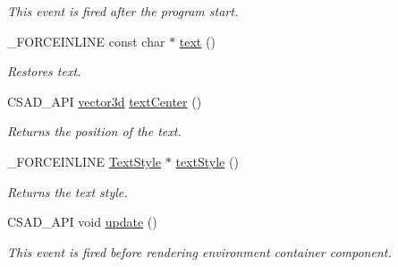 \begin{DoxyCompactItemize}
\begin{DoxyCompactList}\small\item\em This event is fired after the program start. \end{DoxyCompactList}\item 
\hypertarget{classcsad_1_1_text3_d_a189ccec8b8310503a73c5ce304e0e557}{\-\_\-\-F\-O\-R\-C\-E\-I\-N\-L\-I\-N\-E const char $\ast$ \hyperlink{classcsad_1_1_text3_d_a189ccec8b8310503a73c5ce304e0e557}{text} ()}\label{classcsad_1_1_text3_d_a189ccec8b8310503a73c5ce304e0e557}

\begin{DoxyCompactList}\small\item\em Restores text. \end{DoxyCompactList}\item 
\hypertarget{classcsad_1_1_text3_d_ae5732773b756bd15ac48ea9d68140f31}{C\-S\-A\-D\-\_\-\-A\-P\-I \hyperlink{classbt_1_1vector3d}{vector3d} \hyperlink{classcsad_1_1_text3_d_ae5732773b756bd15ac48ea9d68140f31}{text\-Center} ()}\label{classcsad_1_1_text3_d_ae5732773b756bd15ac48ea9d68140f31}

\begin{DoxyCompactList}\small\item\em Returns the position of the text. \end{DoxyCompactList}\item 
\hypertarget{classcsad_1_1_text3_d_a428eb4115f5db77815e829a46e83c505}{\-\_\-\-F\-O\-R\-C\-E\-I\-N\-L\-I\-N\-E \hyperlink{classcsad_1_1_text_style}{Text\-Style} $\ast$ \hyperlink{classcsad_1_1_text3_d_a428eb4115f5db77815e829a46e83c505}{text\-Style} ()}\label{classcsad_1_1_text3_d_a428eb4115f5db77815e829a46e83c505}

\begin{DoxyCompactList}\small\item\em Returns the text style. \end{DoxyCompactList}\item 
\hypertarget{classcsad_1_1_text3_d_ac10717fb94ba35cb7a2d02ce06edaa03}{C\-S\-A\-D\-\_\-\-A\-P\-I void \hyperlink{classcsad_1_1_text3_d_ac10717fb94ba35cb7a2d02ce06edaa03}{update} ()}\label{classcsad_1_1_text3_d_ac10717fb94ba35cb7a2d02ce06edaa03}

\begin{DoxyCompactList}\small\item\em This event is fired before rendering environment container component. \end{DoxyCompactList}\end{DoxyCompactItemize}
